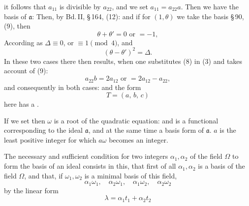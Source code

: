 it follows that $a_{11}$ is divisible by $a_{22}$, and we set $a_{11} = a_{22}a$.
Then we have the basis of $\mathfrak{a}$:
Then, by Bd.\,II, §\,164, (12):
and if for $(1, \theta)$ we take the basis §\,90, (9), then
\[
\theta + \theta' = 0 \text{ or } = -1,
\]
According as $\Delta \equiv 0$, or $\equiv 1 \pmod 4$, and
\[
(\theta - \theta')^2 = \Delta.
\]
In these two cases there then results, when one substitutes (8) in (3)
and takes account of (9):
\[
a_{22}b = 2a_{12} \text{ or } = 2a_{12} - a_{22},
\]
and consequently in both cases:
and the form
\[
T = (a,\,b,\,c)
\]
here has a .

If we set
then $\omega$ is a root of the quadratic equation:
and
is a functional corresponding to the ideal $\mathfrak{a}$, and at the same time a
basis form of $\mathfrak{a}$. $a$ is the least positive integer for which
$a\omega$ becomes an integer.

The necessary and sufficient condition for two
integers $\alpha_1, \alpha_2$ of the field $\Omega$ to form the basis of an ideal
consists in this, that first of all $\alpha_1, \alpha_2$ is a basis of the field $\Omega$,
and that, if $\omega_1, \omega_2$ is a minimal basis of this field,
\[
\alpha_1\omega_1,\quad \alpha_2\omega_1,\quad \alpha_1\omega_2,\quad \alpha_2\omega_2
\]
by the linear form
\[
\lambda = \alpha_1 t_1 + \alpha_2 t_2
\]

